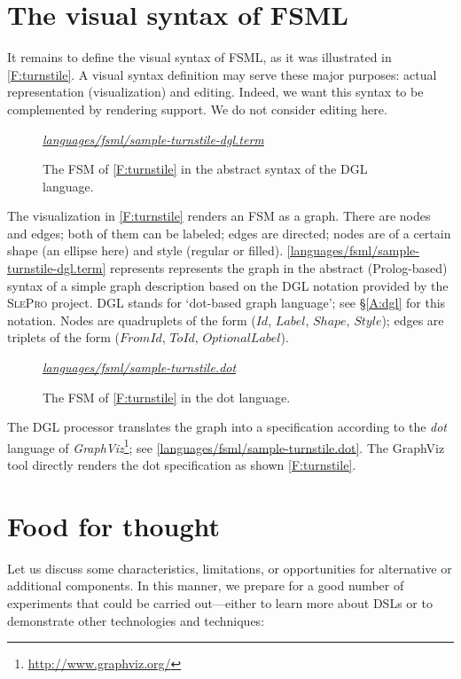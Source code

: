 \documentclass[preprint,authoryear,12pt]{noelsarticle}
\newcommand{\m}[1]{\ensuremath{\mathit{#1}}}
\newcommand{\slepro}{\textsc{SlePro}}
\newcommand{\codefigure}[3]{
\begin{figure}[t!]
\begin{boxedminipage}{\hsize}
\mbox{}\hfill{}{\small\textit{\href{http://github.com/slebok/slepro/tree/master/#2}{#2}}}

\end{boxedminipage}
\caption{#1.}
\label{#2}
\medskip
\end{figure}}
\begin{document}

\section{The visual syntax of FSML}
\label{S:visual}

It remains to define the visual syntax of FSML, as it was illustrated
in \autoref{F:turnstile}. A visual syntax definition may serve these
major purposes: actual representation (visualization) and
editing. Indeed, we want this syntax to be complemented by rendering
support. We do not consider editing here.

\codefigure{%
The FSM of \autoref{F:turnstile} in the abstract syntax of the DGL language}{%
languages/fsml/sample-turnstile-dgl.term}{%
prolog}

The visualization in \autoref{F:turnstile} renders an FSM as a
graph. There are nodes and edges; both of them can be labeled; edges
are directed; nodes are of a certain shape (an ellipse here) and style
(regular or
filled). \autoref{languages/fsml/sample-turnstile-dgl.term} represents
represents the graph in the abstract (Prolog-based) syntax of a simple
graph description based on the DGL notation provided by the \slepro{}
project. DGL stands for `dot-based graph language'; see \S\ref{A:dgl}
for this notation. Nodes are quadruplets of the form (\m{Id},
\m{Label}, \m{Shape}, \m{Style}); edges are triplets of the form
(\m{FromId}, \m{ToId}, \m{OptionalLabel}).

\codefigure{%
The FSM of \autoref{F:turnstile} in the dot language}{%
languages/fsml/sample-turnstile.dot}{%
dot}

The DGL processor translates the graph into a specification according
to the \emph{dot} language of
\emph{GraphViz}\footnote{\url{http://www.graphviz.org/}}; see
\autoref{languages/fsml/sample-turnstile.dot}. The GraphViz tool
directly renders the dot specification as shown \autoref{F:turnstile}.


\section{Food for thought}
\label{S:concl}

Let us discuss some characteristics, limitations, or opportunities
for alternative or additional components. In this manner, we prepare
for a good number of experiments that could be carried out---either to
learn more about DSLs or to demonstrate other technologies and
techniques:
\end{document}

